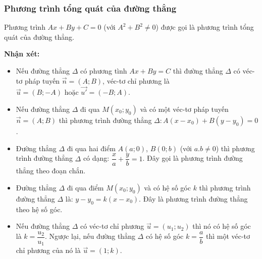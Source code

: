\subsubsection{Phương trình tổng quát của đường thẳng}
\begin{dn}
	Phương trình $Ax + By+C=0$ (với $A^2 + B^2 \ne 0$) được gọi là phương trình tổng quát của đường thẳng.
\end{dn}
\begin{note}\textbf{Nhận xét:}
\begin{itemize}
	\item Nếu đường thẳng $\Delta$ có phương tình $Ax + By = C$ thì đường thẳng $\Delta$ có véc-tơ pháp tuyến $\overrightarrow{n} = (A;B)$, véc-tơ chỉ phương là $ \overrightarrow{u} = (B;-A) \text{ hoặc } \overrightarrow{u'} = (-B;A)$.
	\item Nếu đường thẳng $\Delta$ đi qua $M\left(x_0;y_0 \right)$ và có một véc-tơ pháp tuyến $\overrightarrow{n} = (A;B)$ thì phương trình đường thẳng $\Delta : A\left( x - x_0 \right) + B \left( y - y_0 \right) = 0$.
	\item Đường thẳng $\Delta$ đi qua hai điểm $A(a;0)$, $B(0;b)$ (với $a.b \ne 0$) thì phương trình đường thẳng $\Delta$ có dạng: $ \dfrac{x}{a} + \dfrac{y}{b} = 1$. Đây gọi là phương trình đường thẳng theo đoạn chắn.
	\item Đường thẳng $\Delta$ đi qua điểm $M \left(x_0; y_0 \right)$ và có hệ số góc $k$ thì phương trình đường thẳng $\Delta$ là: $ y - y_0 = k \left(x - x_0 \right)$. Đây là phương trình đường thẳng theo hệ số góc.
	\item Nếu đường thẳng $\Delta$ có véc-tơ chỉ phương $\vec{u}=(u_1;u_2)$ thì nó có hệ số góc là $k=\dfrac{u_2}{u_1}$. Ngược lại, nếu đường thẳng $\Delta$ có hệ số góc $k=\dfrac{a}{b}$ thì một véc-tơ chỉ phương của nó là $\vec{u}=(1;k)$.
\end{itemize}
\end{note}
